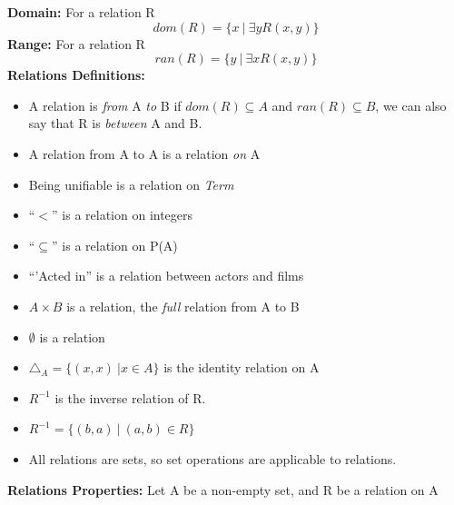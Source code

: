 \documentclass[a4paper,10pt]{article}
\begin{document}
\textcolor{BlueGreen}{\textbf{Domain:}} For a relation R\\
\begin{equation*}
dom(R) = \{x \ | \ \exists y R(x,y)\}
\end{equation*}
\textcolor{BlueGreen}{\textbf{Range:}} For a relation R\\
\begin{equation*}
ran(R) = \{y \ | \ \exists x R(x,y)\}
\end{equation*}
\textcolor{BlueGreen}{\textbf{Relations Definitions:}} 
\renewcommand{\labelitemi}{\textperiodcentered}
\begin{itemize}
\item A relation is \emph{from} A \emph{to} B if $dom(R) \subseteq A$ and $ran(R) \subseteq B$, we can also say that R is \emph{between} A and B. 
\item A relation from A to A is a relation \emph{on} A 
\item Being unifiable is a relation on \emph{Term}
\item ``$<$'' is a relation on integers 
\item ``$\subseteq$'' is a relation on P(A)
\item ``'Acted in'' is a relation between actors and films  
\item $A \times B$ is a relation, the \emph{full} relation from A to B 
\item $\emptyset$ is a relation 
\item $\triangle_{A} = \{(x,x) \ | x \in A\}$ is the identity relation on A 
\item $R^{-1}$ is the inverse relation of R. 
\item $R^{-1}=\{(b,a) \ | \ (a,b) \in R \}$
\item All relations are sets, so set operations are applicable to relations. 
\end{itemize}
\newpage
\textcolor{BlueGreen}{\textbf{Relations Properties:}} Let A be a non-empty set, and R be a relation on A
\renewcommand{\labelitemi}{\textperiodcentered}
\end{document}
